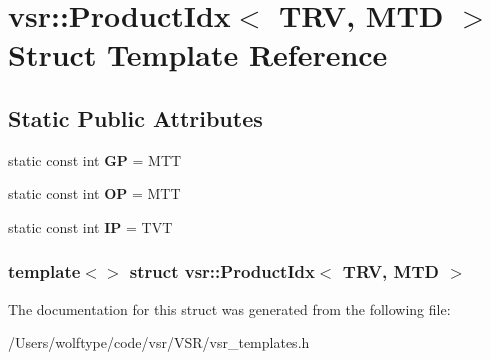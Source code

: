 \hypertarget{structvsr_1_1_product_idx_3_01_t_r_v_00_01_m_t_d_01_4}{\section{vsr\-:\-:Product\-Idx$<$ T\-R\-V, M\-T\-D $>$ Struct Template Reference}
\label{structvsr_1_1_product_idx_3_01_t_r_v_00_01_m_t_d_01_4}
}
\subsection*{Static Public Attributes}
\begin{DoxyCompactItemize}
\item 
\hypertarget{structvsr_1_1_product_idx_3_01_t_r_v_00_01_m_t_d_01_4_abc03d4bf7b184c516f672853791e77c2}{static const int {\bfseries G\-P} = M\-T\-T}\label{structvsr_1_1_product_idx_3_01_t_r_v_00_01_m_t_d_01_4_abc03d4bf7b184c516f672853791e77c2}

\item 
\hypertarget{structvsr_1_1_product_idx_3_01_t_r_v_00_01_m_t_d_01_4_af6aa9a219d45b24320ca3c2962d62603}{static const int {\bfseries O\-P} = M\-T\-T}\label{structvsr_1_1_product_idx_3_01_t_r_v_00_01_m_t_d_01_4_af6aa9a219d45b24320ca3c2962d62603}

\item 
\hypertarget{structvsr_1_1_product_idx_3_01_t_r_v_00_01_m_t_d_01_4_ad025a2ca87d09125ebbff1635580164b}{static const int {\bfseries I\-P} = T\-V\-T}\label{structvsr_1_1_product_idx_3_01_t_r_v_00_01_m_t_d_01_4_ad025a2ca87d09125ebbff1635580164b}

\end{DoxyCompactItemize}
\subsubsection*{template$<$$>$ struct vsr\-::\-Product\-Idx$<$ T\-R\-V, M\-T\-D $>$}



The documentation for this struct was generated from the following file\-:\begin{DoxyCompactItemize}
\item 
/\-Users/wolftype/code/vsr/\-V\-S\-R/vsr\-\_\-templates.\-h\end{DoxyCompactItemize}
